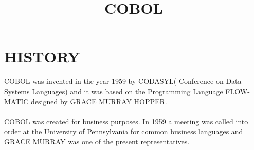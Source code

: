 \documentclass{article}
\title{COBOL}
\begin{document}
	\section{HISTORY}
	COBOL was invented in the year 1959 by CODASYL( Conference on Data Systems Languages) and it was based on the Programming Language FLOW-MATIC designed by GRACE MURRAY HOPPER.
	\paragraph{} 
	COBOL was created for business purposes. In 1959 a meeting was called into order at the University of Pennsylvania for common business languages and GRACE MURRAY was one of the present representatives.
	
\end{document}
